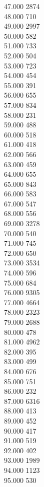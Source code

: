 { 47.000	2874 \\
 48.000	710 \\
 49.000	2997 \\
 50.000	582 \\
 51.000	733 \\
 52.000	504 \\
 53.000	723 \\
 54.000	454 \\
 55.000	391 \\
 56.000	655 \\
 57.000	834 \\
 58.000	231 \\
 59.000	488 \\
 60.000	518 \\
 61.000	418 \\
 62.000	566 \\
 63.000	459 \\
 64.000	655 \\
 65.000	843 \\
 66.000	583 \\
 67.000	547 \\
 68.000	556 \\
 69.000	3278 \\
 70.000	540 \\
 71.000	745 \\
 72.000	650 \\
 73.000	3534 \\
 74.000	596 \\
 75.000	684 \\
 76.000	9305 \\
 77.000	4664 \\
 78.000	2323 \\
 79.000	2688 \\
 80.000	478 \\
 81.000	4962 \\
 82.000	395 \\
 83.000	499 \\
 84.000	676 \\
 85.000	751 \\
 86.000	232 \\
 87.000	6316 \\
 88.000	413 \\
 89.000	452 \\
 90.000	417 \\
 91.000	519 \\
 92.000	402 \\
 93.000	1989 \\
 94.000	1123 \\
 95.000	530 \\
}
